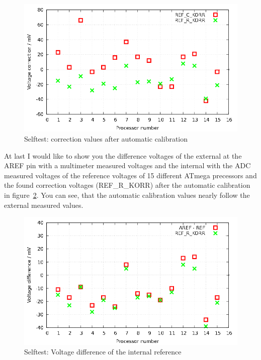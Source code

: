 \begin{figure}[H]
  \centering
  \includegraphics[width=16cm]{../GNU/SelfTrefKorr.pdf}
  \caption{Selftest: correction values after automatic calibration}
  \label{fig:SelfTrefKorr}
\end{figure}

At last I would like to show you the difference voltages of the external at the
AREF pin with a multimeter measured voltages and the internal with the ADC
measured voltages of the reference voltages of 15 different ATmega precessors
and the found correction voltages (REF\_R\_KORR) after the automatic calibration in
figure~\ref{fig:SelfTrefDiff}.
You can see, that the automatic calibration values nearly follow the external measured values.

\begin{figure}[H]
  \centering
  \includegraphics[width=16cm]{../GNU/SelfTrefDiff.pdf}
  \caption{Selftest: Voltage difference of the internal reference}
  \label{fig:SelfTrefDiff}
\end{figure}

